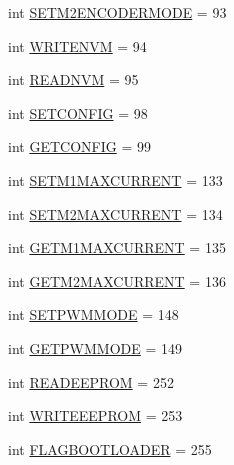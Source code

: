\begin{DoxyCompactItemize}
\item 
int \mbox{\hyperlink{classtoxic__hardware_1_1roboclaw__3_1_1Roboclaw_1_1Cmd_ab8ccfdee1f527090a2e1bedcfc6bb65d}{S\+E\+T\+M2\+E\+N\+C\+O\+D\+E\+R\+M\+O\+DE}} = 93
\item 
int \mbox{\hyperlink{classtoxic__hardware_1_1roboclaw__3_1_1Roboclaw_1_1Cmd_ab7ad074d286dccbe386cbf9ff2157fdd}{W\+R\+I\+T\+E\+N\+VM}} = 94
\item 
int \mbox{\hyperlink{classtoxic__hardware_1_1roboclaw__3_1_1Roboclaw_1_1Cmd_ad70382e38639bfa11c90f3b92e3b9dfe}{R\+E\+A\+D\+N\+VM}} = 95
\item 
int \mbox{\hyperlink{classtoxic__hardware_1_1roboclaw__3_1_1Roboclaw_1_1Cmd_a8ee1b998b269bcc6cf0d84895a2f2d9f}{S\+E\+T\+C\+O\+N\+F\+IG}} = 98
\item 
int \mbox{\hyperlink{classtoxic__hardware_1_1roboclaw__3_1_1Roboclaw_1_1Cmd_a779f8c61d9941e3c201f0aba886a17f2}{G\+E\+T\+C\+O\+N\+F\+IG}} = 99
\item 
int \mbox{\hyperlink{classtoxic__hardware_1_1roboclaw__3_1_1Roboclaw_1_1Cmd_ac9eda5476e71091de99ace27c88df633}{S\+E\+T\+M1\+M\+A\+X\+C\+U\+R\+R\+E\+NT}} = 133
\item 
int \mbox{\hyperlink{classtoxic__hardware_1_1roboclaw__3_1_1Roboclaw_1_1Cmd_a380ae8336824145de8f46340f5160290}{S\+E\+T\+M2\+M\+A\+X\+C\+U\+R\+R\+E\+NT}} = 134
\item 
int \mbox{\hyperlink{classtoxic__hardware_1_1roboclaw__3_1_1Roboclaw_1_1Cmd_a4f34b6a343d8e39b46fdf6dc046d336c}{G\+E\+T\+M1\+M\+A\+X\+C\+U\+R\+R\+E\+NT}} = 135
\item 
int \mbox{\hyperlink{classtoxic__hardware_1_1roboclaw__3_1_1Roboclaw_1_1Cmd_ae809a9cb7e9925a7bec93f1d50aa26f0}{G\+E\+T\+M2\+M\+A\+X\+C\+U\+R\+R\+E\+NT}} = 136
\item 
int \mbox{\hyperlink{classtoxic__hardware_1_1roboclaw__3_1_1Roboclaw_1_1Cmd_ada01acd049241528247c85758a1f18f1}{S\+E\+T\+P\+W\+M\+M\+O\+DE}} = 148
\item 
int \mbox{\hyperlink{classtoxic__hardware_1_1roboclaw__3_1_1Roboclaw_1_1Cmd_a4623c878bfa3801984ed9b029ec26839}{G\+E\+T\+P\+W\+M\+M\+O\+DE}} = 149
\item 
int \mbox{\hyperlink{classtoxic__hardware_1_1roboclaw__3_1_1Roboclaw_1_1Cmd_a92a69eadf0f81f653a6f74be93a150f0}{R\+E\+A\+D\+E\+E\+P\+R\+OM}} = 252
\item 
int \mbox{\hyperlink{classtoxic__hardware_1_1roboclaw__3_1_1Roboclaw_1_1Cmd_a3f5df487bb061c8072c3e39eef15abd4}{W\+R\+I\+T\+E\+E\+E\+P\+R\+OM}} = 253
\item 
int \mbox{\hyperlink{classtoxic__hardware_1_1roboclaw__3_1_1Roboclaw_1_1Cmd_ac3d1533d23fc8092582fc55bcd116ede}{F\+L\+A\+G\+B\+O\+O\+T\+L\+O\+A\+D\+ER}} = 255
\end{DoxyCompactItemize}


